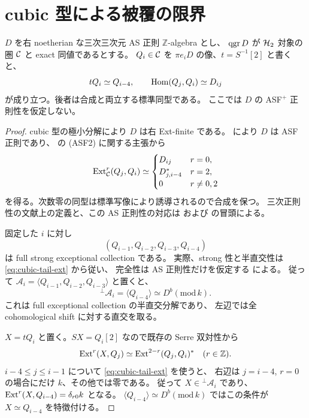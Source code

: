 \section{cubic 型による被覆の限界}
\label{sec:cubic-coverage}

\begin{lemma}
\label{lem:cubic-serre-objects}
$D$ を右 noetherian な三次三次元 AS 正則 $\mathbb Z$-algebra とし、
$\operatorname{qgr} D$ が $\mathcal H_2$ 対象の圏 $\mathcal C$ と exact 同値であるとする。
$Q_i\in\mathcal C$ を $\pi e_iD$ の像、$t=S^{-1}[2]$ と書くと、
\[
 tQ_i\simeq Q_{i-4},\qquad
 \operatorname{Hom}(Q_j,Q_i)\simeq D_{ij}
\]
が成り立つ。後者は合成と両立する標準同型である。
ここでは $D$ の ASF$^+$ 正則性を仮定しない。
\end{lemma}
\begin{proof}
cubic 型の極小分解により $D$ は右 Ext-finite である。
\cite[Theorem 4.8]{MN2025} により $D$ は ASF 正則であり、
\cite[Proposition 4.11(2)]{MN2025} の (ASF2) に関する主張から
\begin{equation}
 \operatorname{Ext}^r_{\mathcal C}(Q_j,Q_i)\simeq
 \begin{cases}
 D_{ij}&r=0,\\
 D_{j,i-4}^{*}&r=2,\\
 0&r\ne0,2
 \end{cases}
 \label{eq:cubic-tail-ext}
\end{equation}
を得る。次数零の同型は標準写像により誘導されるので合成を保つ。
三次正則性の文献上の定義と、この AS 正則性の対応は
\cite[arXiv v3, Definition 4.1.1, Corollary 5.5.9]{VdB2011}
および \cite[Section 6.2]{MN2025} の冒頭による。

固定した $i$ に対し
\[
 (Q_{i-1},Q_{i-2},Q_{i-3},Q_{i-4})
\]
は full strong exceptional collection である。
実際、strong 性と半直交性は \eqref{eq:cubic-tail-ext} から従い、
完全性は AS 正則性だけを仮定する \cite[Lemma 6.10]{MN2025} による。
従って $\mathcal A_i=\langle Q_{i-1},Q_{i-2},Q_{i-3}\rangle$ と置くと、
\[
 {}^{\perp}\mathcal A_i=\langle Q_{i-4}\rangle\simeq D^b(\mathrm{mod}\,k).
\]
これは full exceptional collection の半直交分解であり、
左辺では全 cohomological shift に対する直交を取る。

$X=tQ_i$ と置く。$SX=Q_i[2]$ なので既存の Serre 双対性から
\[
 \operatorname{Ext}^r(X,Q_j)\simeq\operatorname{Ext}^{2-r}(Q_j,Q_i)^*
 \quad(r\in\mathbb Z).
\]
$i-4\le j\le i-1$ について \eqref{eq:cubic-tail-ext} を使うと、
右辺は $j=i-4$, $r=0$ の場合にだけ $k$、その他では零である。
従って $X\in{}^{\perp}\mathcal A_i$ であり、
$\operatorname{Ext}^r(X,Q_{i-4})=\delta_{r0}k$ となる。
$\langle Q_{i-4}\rangle\simeq D^b(\mathrm{mod}\,k)$ ではこの条件が
$X\simeq Q_{i-4}$ を特徴付ける。
\end{proof}

